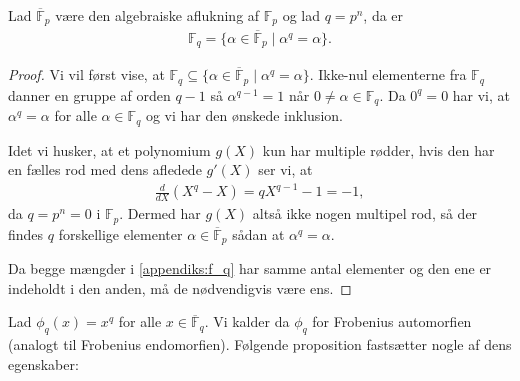 \begin{thm}
\label{appendiks:f_qtheorem}
Lad $\overline{\mathbb{F}}_p$ være den algebraiske aflukning af $\mathbb{F}_p$ og lad $q = p^n$, da er
\begin{align}
	\label{appendiks:f_q}
	\mathbb{F}_q = \{ \alpha \in \overline{\mathbb{F}}_p \mid \alpha^q = \alpha 
	\}.
\end{align}
\end{thm}
\begin{proof}
Vi vil først vise, at $\mathbb{F}_q \subseteq \{ \alpha \in \overline{\mathbb{F}}_p \mid \alpha^q = \alpha \}$. Ikke-nul elementerne fra $\mathbb{F}_q$ danner en gruppe af orden $q-1$ så $\alpha^{q-1} = 1$ når 
$0 \neq \alpha \in \mathbb{F}_q$. Da $0^q = 0$ har vi, at $\alpha^q = \alpha$ for alle $\alpha \in \mathbb{F}_q$ og vi har den ønskede inklusion.

Idet vi husker, at et polynomium $g(X)$ kun har multiple rødder, hvis den har en fælles rod med dens afledede $g'(X)$ ser vi, at 
\begin{align*}
	\frac{d}{dX} (X^q - X) = qX^{q-1} - 1 = -1,
\end{align*}
da $q = p^n = 0$ i $\mathbb{F}_p$. Dermed har $g(X)$ altså ikke nogen multipel rod, så der findes $q$ forskellige elementer $\alpha \in \overline{\mathbb{F}}_p$ sådan at $\alpha^q = \alpha$.

Da begge mængder i \eqref{appendiks:f_q} har samme antal elementer og den ene er indeholdt i den anden, må de nødvendigvis være ens.
\end{proof}
Lad $\phi_q(x) = x^q$ for alle $x \in \overline{\mathbb{F}}_q$. Vi kalder da $\phi_q$ for Frobenius automorfien (analogt til Frobenius endomorfien). Følgende proposition fastsætter nogle af dens egenskaber:

